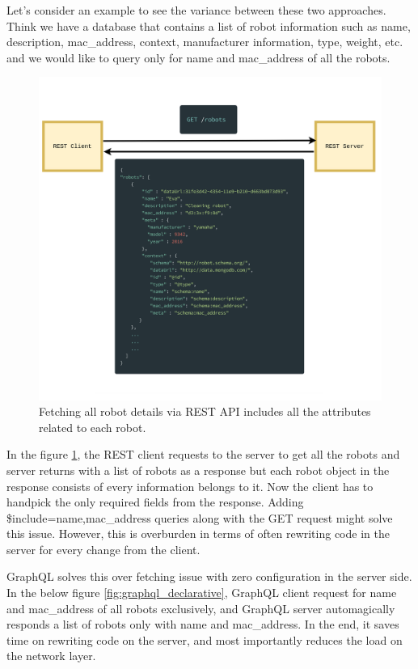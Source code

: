 	Let's consider an example to see the variance between these two approaches. Think we have a database that contains a list of robot information such as name, description, mac\_address, context, manufacturer information, type, weight, etc. and we would like to query only for name and mac\_address of all the robots. 
	
	\begin{figure}[!htbp] 
		\begin{center}
			\includegraphics[trim={0 0 0 2cm},clip,scale=0.08]{./images/png/rest_declarative}	
			\caption{Fetching all robot details via REST API includes all the attributes related to each robot.}	
			\label{fig:rest_declarative}	
		\end{center}
	\end{figure}

	In the figure \ref{fig:rest_declarative}, the REST client requests to the server to get all the robots and server returns with a list of robots as a response but each robot object in the response consists of every information belongs to it. Now the client has to handpick the only required fields from the response. 
	Adding \$include=name,mac\_address queries along with the GET request might solve this issue. However, this is overburden in terms of often rewriting code in the server for every change from the client.   
	
	GraphQL solves this over fetching issue with zero configuration in the server side. In the below figure \ref{fig:graphql_declarative}, GraphQL client request for name and mac\_address of all robots exclusively, and GraphQL server automagically responds a list of robots only with name and mac\_address. In the end, it saves time on rewriting code on the server, and most importantly reduces the load on the network layer.
	
